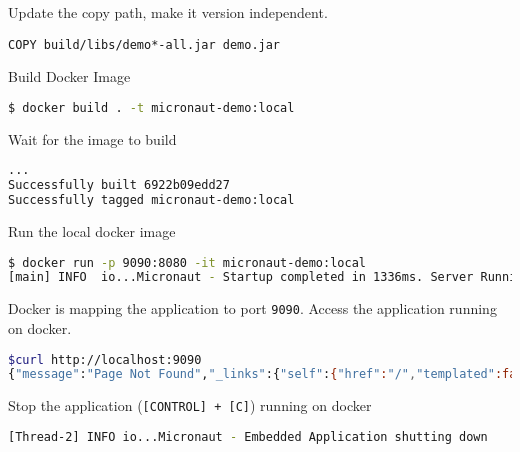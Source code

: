 \begin{enumerate}
Update the copy path, make it version independent.

\begin{lstlisting}[language=Docker]
COPY build/libs/demo*-all.jar demo.jar
\end{lstlisting}

Build Docker Image

\begin{lstlisting}[language=bash]
$ docker build . -t micronaut-demo:local
\end{lstlisting}

Wait for the image to build

\begin{lstlisting}[language=bash]
...
Successfully built 6922b09edd27
Successfully tagged micronaut-demo:local
\end{lstlisting}

Run the local docker image

\begin{lstlisting}[language=bash]
$ docker run -p 9090:8080 -it micronaut-demo:local
[main] INFO  io...Micronaut - Startup completed in 1336ms. Server Running: http://b09cb58fb87a:8080
\end{lstlisting}

Docker is mapping the application to port \texttt{9090}.  Access the application running on docker.

\begin{lstlisting}[language=bash]
$curl http://localhost:9090
{"message":"Page Not Found","_links":{"self":{"href":"/","templated":false}}}
\end{lstlisting}

Stop the application (\texttt{[CONTROL] + [C]}) running on docker

\begin{lstlisting}[language=bash]
[Thread-2] INFO io...Micronaut - Embedded Application shutting down
\end{lstlisting}


\end{enumerate}